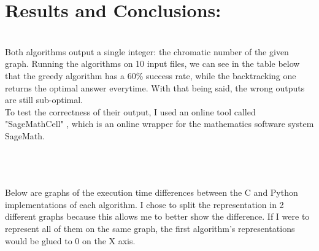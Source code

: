 \documentclass[12pt]{article}
\begin{document}
\section{Results and Conclusions:}  \quad \\
\indent Both algorithms output a single integer: the chromatic number of the given graph. Running the algorithms on 10 input files, we can see in the table below that the greedy algorithm has a 60\% success rate, while the backtracking one returns the optimal answer everytime. With that being said, the wrong outputs are still sub-optimal. \\
\indent To test the correctness of their output, I used an online tool called "SageMathCell" \cite{sagemathcell}, which is an online wrapper for the mathematics software system SageMath.  \\ \\
 \\ \\
\indent Below are graphs of the execution time differences between the C and Python implementations of each algorithm. I chose to split the representation in 2 different graphs because this allows me to better show the difference. If I were to represent all of them on the same graph, the first algorithm's representations would be glued to 0 on the X axis. 
\end{document}
